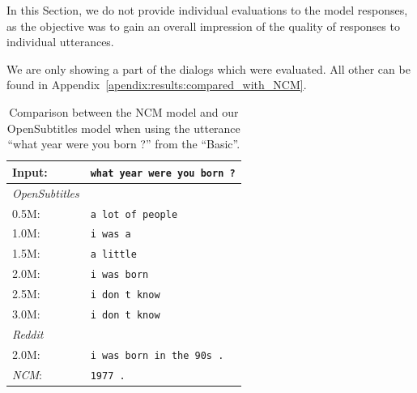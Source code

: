 In this Section, we do not provide individual evaluations to the model responses, as the objective was to gain an overall impression of the quality of responses to individual utterances.

We are only showing a part of the dialogs which were evaluated. All other can be found in Appendix~\ref{apendix:results:compared_with_NCM}.
\\
\begin{table}[H]
	\centering
	\begin{adjustbox}{max width=\textwidth}
		\begin{tabularx}{\textwidth}{lX}
			\toprule
			Input: 	& \texttt{what year were you born ?}\\
			\midrule
			\emph{OpenSubtitles}\\
			0.5M: 	& \texttt{a lot of people}\\
			1.0M: 	& \texttt{i was a}\\
			1.5M:	& \texttt{a little}\\
			2.0M:	& \texttt{i was born}\\
			2.5M:	& \texttt{i don t know}\\
			3.0M:	& \texttt{i don t know}\\
			\midrule
			\emph{Reddit}\\
			2.0M:	& \texttt{i was born in the 90s .}\\
			\midrule
			\emph{NCM}:	& \texttt{1977 .}\\
			\bottomrule
		\end{tabularx}
	\end{adjustbox}
	\caption{Comparison between the NCM model and our OpenSubtitles model when using the utterance ``what year were you born ?'' from the ``Basic''.}
	\label{results:example8_output:Neural_Conversational_Model_compared}
\end{table}

